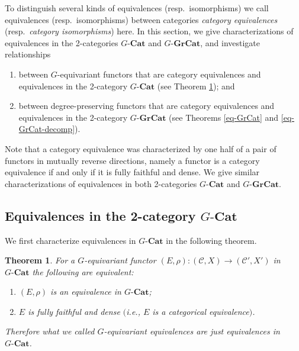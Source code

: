 \documentclass{surv-l}
\numberwithin{equation}{chapter}
\numberwithin{figure}{chapter}
\theoremstyle{plain}
\newtheorem{thm}{Theorem}[section]
\theoremstyle{definition}
\theoremstyle{remark}
\newcommand{\GCat}{G\text{-}\mathbf{Cat}}
\newcommand{\GGrCat}{G\text{-}\mathbf{GrCat}}
\begin{document}
To distinguish several kinds of equivalences (resp.\ isomorphisms)
we call equivalences (resp.\ isomorphisms)
between categories
\emph{category equivalences}
(resp.\ \emph{category isomorphisms}) here.
In this section, we give characterizations of equivalences in the 2-categories
$\GCat$ and $\GGrCat$, and investigate relationships
\begin{enumerate}[label=(\alph*)]
\item between $G$-equivariant functors that are
category equivalences and equivalences in the 2-category $\GCat$
(see Theorem \ref{thm:eqvar-eq}); and
\item between degree-preserving functors that are
category equivalences and equivalences in the 2-category $\GGrCat$
(see Theorems \ref{eq-GrCat} and \ref{eq-GrCat-decomp}).
\end{enumerate}
Note that a category equivalence was characterized by one half of a pair of functors in mutually reverse directions,
namely a functor is a category equivalence if and only if it is fully faithful and dense.
We give similar characterizations of equivalences in both 2-categories $\GCat$
and $\GGrCat$.

\subsection{Equivalences in the 2-category $\GCat$}

We first characterize equivalences in $\GCat$ in the following theorem.

\begin{thm}\label{thm:eqvar-eq}
For a $G$-equivariant functor
$(E,\rho)\colon ({\mathcal{C}}, X) \to ({\mathcal{C}}', X')$ in $\GCat$
the following are equivalent:
\begin{enumerate}
\item $(E, \rho)$ is an equivalence in $\GCat$;
\item $E$ is fully faithful and dense
$($i.e., $E$ is a categorical equivalence$)$.
\end{enumerate}
Therefore what we called \emph{$G$-equivariant equivalences}
are just equivalences in $\GCat$.
\end{thm}
\end{document}
